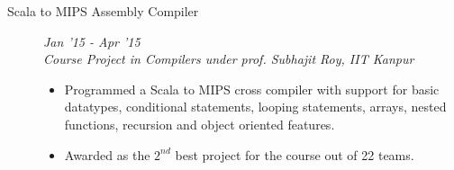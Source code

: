 \documentclass[9pt]{article}
\newenvironment{changemargin}[2]{%
  \begin{list}{}{%
      \setlength{\topsep}{0pt}%
    \setlength{\leftmargin}{#1}%
    \setlength{\rightmargin}{#2}%
    \setlength{\listparindent}{\parindent}%
  \setlength{\itemindent}{\parindent}%
    \setlength{\parsep}{\parskip}%
    }%
  \item[]}{\end{list}
    }
\newenvironment{body} {
  \vspace*{-16pt}
        \begin{changemargin}{-0.6in}{-0.65in}
        }	
        {\end{changemargin}
}
\begin{document}
\begin{body}
\begin{description}


  \item[\normalsize{Scala to MIPS Assembly Compiler}] \hfill \textit{Jan '15 - Apr '15} \\
    \textit{Course Project in Compilers under prof. Subhajit Roy, IIT Kanpur}
  \begin{itemize}
    \item Programmed a Scala to MIPS cross compiler with support for basic 
      datatypes, conditional statements,
      looping statements, arrays, nested functions, recursion and object oriented 
      features.
    \item Awarded as the $2^{nd}$ best project for the course out of 22 teams.
  \end{itemize}


\end{description}
\end{body}
\end{document}
